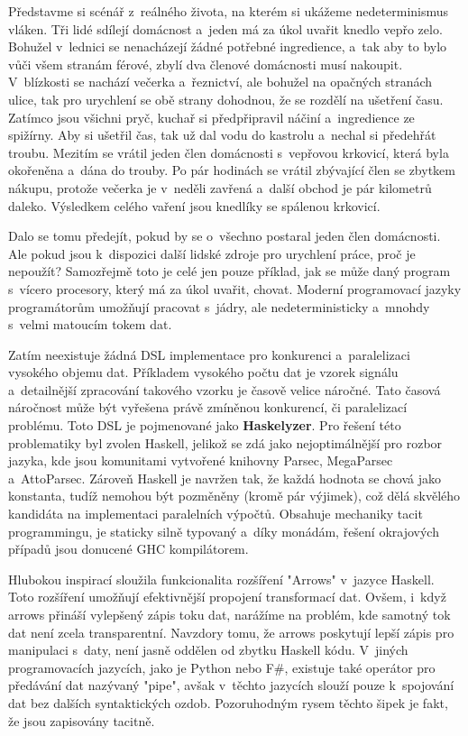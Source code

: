 \documentclass[male, czech]{kithesis}
\begin{document}
Představme si scénář z~reálného života, 
na kterém si ukážeme nedeterminismus vláken.
Tři lidé sdílejí domácnost
a~jeden má za úkol uvařit knedlo vepřo zelo.
Bohužel v~lednici se nenacházejí žádné potřebné ingredience,
a~tak aby to bylo vůči všem stranám férové,
zbylí dva členové domácnosti musí nakoupit.
V~blízkosti se nachází večerka a~řeznictví, 
ale bohužel na opačných stranách ulice, 
tak pro urychlení se obě strany dohodnou, 
že se rozdělí na ušetření času.
Zatímco jsou všichni pryč,
kuchař si předpřipravil náčiní a~ingredience ze spižírny.
Aby si ušetřil čas, 
tak už dal vodu do kastrolu a~nechal si předehřát troubu.
Mezitím se vrátil jeden člen domácnosti s~vepřovou krkovicí,
která byla okořeněna a~dána do trouby.
Po pár hodinách se vrátil zbývající člen se zbytkem nákupu, 
protože večerka je v~neděli zavřená
a~další obchod je pár kilometrů daleko.
Výsledkem celého vaření jsou knedlíky se spálenou krkovicí.

Dalo se tomu předejít,
pokud by se o~všechno postaral jeden člen domácnosti.
Ale pokud jsou k~dispozici další lidské zdroje pro urychlení práce,
proč je nepoužít?
Samozřejmě toto je celé jen pouze příklad,
jak se může daný program s~vícero procesory, 
který má za úkol uvařit, chovat.
Moderní programovací jazyky programátorům umožňují pracovat s~jádry,
ale nedeterministicky a~mnohdy s~velmi matoucím tokem dat. 

Zatím neexistuje žádná DSL implementace pro konkurenci
a~paralelizaci vysokého objemu dat.
Příkladem vysokého počtu dat je vzorek signálu
a~detailnější zpracování takového vzorku je časově velice náročné. 
Tato časová náročnost může být vyřešena právě zmíněnou konkurencí, 
či paralelizací problému. 
Toto DSL je pojmenované jako \textbf{Haskelyzer}.
Pro řešení této problematiky byl zvolen Haskell, 
jelikož se zdá jako nejoptimálnější pro rozbor jazyka,
kde jsou komunitami vytvořené knihovny Parsec, MegaParsec a~AttoParsec.
Zároveň Haskell je navržen tak, 
že každá hodnota se chová jako konstanta, 
tudíž nemohou být pozměněny (kromě pár výjimek),
což dělá skvělého kandidáta na implementaci paralelních výpočtů.
Obsahuje mechaniky tacit programmingu, 
je staticky silně typovaný a~díky monádám, 
řešení okrajových případů jsou donucené GHC kompilátorem.

Hlubokou inspirací sloužila funkcionalita rozšíření "Arrows" 
v~jazyce Haskell. %
Toto rozšíření umožňují efektivnější propojení transformací dat.
Ovšem,
i~když arrows přináší vylepšený zápis toku dat,
narážíme na problém,
kde samotný tok dat není zcela transparentní.
Navzdory tomu,
že arrows poskytují lepší zápis pro manipulaci s~daty,
není jasně oddělen od zbytku Haskell kódu.
V~jiných programovacích jazycích,
jako je Python nebo F\#,
existuje také operátor pro předávání dat nazývaný "pipe",
avšak v~těchto jazycích slouží pouze k~spojování dat bez dalších syntaktických ozdob.
Pozoruhodným rysem těchto šipek je fakt,
že jsou zapisovány tacitně.
\end{document}
